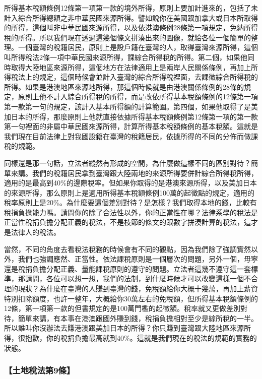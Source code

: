 \documentclass[oneside,sub3section]{ctexbook}
\begin{document}
所得基本稅額條例12條第一項第一款的境外所得，原則上要加計進來的，包括了未計入綜合所得總額之非中華民國來源所得。譬如說你在美國跟加拿大或日本所取得的所得，這個叫非中華民國來源所得，以及依港澳條例28條第一項規定，免納所得稅的所得。所以我們現在透過這幾個條文拼湊出來的圖像，就給各位一個簡單的整理。一個臺灣的稅籍居民，原則上是設戶籍在臺灣的人，取得臺灣來源所得，這個叫所得稅法2條一項中華民國來源所得，課綜合所得稅的所得。第二個，如果他同時取得大陸地區來源所得，這個地方在法律適用上是兩岸人民關係條例，再加上所得稅法上的規定，這個時候會並計入臺灣的綜合所得稅裡面，去課徵綜合所得稅的所得。如果是港澳地區來源地所得，那這個時候就是由港澳關係條例的28條的規定，原則上他不計入綜合所得稅的所得，而是改依所得基本稅額條例的12條第一項第一款第一句的規定，該計入基本所得額的計算範圍。第四個，如果他取得了是美加日本的所得，那麼原則上他就直接依據所得基本稅額條例第12條第一項的第一款第一句裡面的非屬中華民國來源所得，計算所得基本稅額條例的基本稅額。這就是我們現在目前法律上對我國設籍在臺灣的稅籍居民，依據所得的不同的分佈而做課稅的規範。

同樣還是那一句話，立法者縱然有形成的空間，為什麼做這樣不同的區別對待？簡單來講。我們的稅籍居民拿到臺灣跟大陸兩地的來源所得要併計綜合所得稅所得，適用的是最高到40\%的邊際稅率。但如果你取得的是港澳來源所得，以及美加日本的來源所得，那么原則上是適用所得基本稅額條例100萬的起徵點的規定，適用的稅率原則上是20\%。為什麼要這個差別對待？是怎樣？我們取得本地的錢，比較有稅捐負擔能力嗎。請問你的除了合法性以外，你的正當性在哪？法律系學的稅法是正當性稅捐負擔分配正義的稅法，不是枝節的條文的跟數字拼湊計算的稅法，這才是法律人的稅法。

當然，不同的角度去看稅法稅務的時候會有不同的觀點，因為我們除了強調實然以外，我們也強調應然、正當性。依法課稅原則是一個層次的問題，另外一個，毋寧還是稅捐負擔分配正義、量能課稅原則的遵守的問題。立法者這幾不遵守這一套標準，那請問，各位可以想一想，我們的法制，到什麼時候才可以改變這樣一個不合理的現狀？為什麼在臺灣的人賺到臺灣的錢，免稅額給你大概十幾萬，再加上薪資特別扣除額度，也許一整年，大概給你30萬左右的免稅額，但所得基本稅額條例的12條，第一項第一款的但書規定的是100萬門檻的起徵額。稅率就又更做差別對待，簡單來講，有本事在港澳跟國外賺到錢，稅捐負擔相對至少是綜所稅的一半。所以誰叫你沒辦法去賺港澳跟美加日本的所得？你只賺到臺灣跟大陸地區來源所得，很抱歉，你的稅捐負擔最高就到40\%。這就是我們現在的稅法的規範的實務的狀態。

\hypertarget{ux571fux5730ux7a05ux6cd5ux7b2c9ux689d}{%
\subsubsection{【土地稅法第9條】}\label{ux571fux5730ux7a05ux6cd5ux7b2c9ux689d}}
\end{document}
